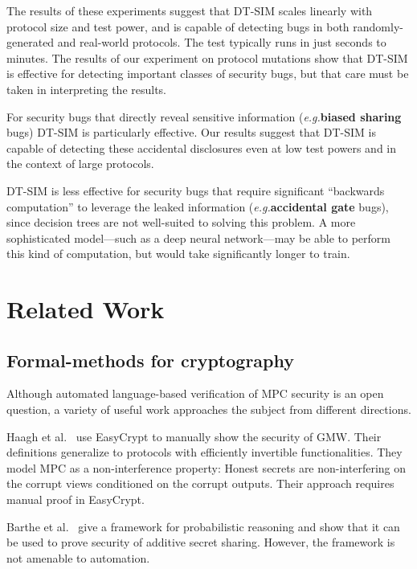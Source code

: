 \documentclass[acmlarge, manuscript, screen, review, anonymous, table]{acmart}
\newcommand{\eg}{\textit{e.g.}\xspace}
\newcommand{\toolname}{\textsc{DT-SIM}\xspace}
\begin{document}
The results of these experiments suggest that \toolname scales linearly with protocol size and test power, and is capable of detecting bugs in both randomly-generated and real-world protocols. The test typically runs in just seconds to minutes. The results of our experiment on protocol mutations show that \toolname is effective for detecting important classes of security bugs, but that care must be taken in interpreting the results.

For security bugs that directly reveal sensitive information (\eg \textbf{biased sharing} bugs) \toolname is particularly effective. Our results suggest that \toolname is capable of detecting these accidental disclosures even at low test powers and in the context of large protocols.
 
\toolname is less effective for security bugs that require significant ``backwards computation'' to leverage the leaked information (\eg \textbf{accidental gate} bugs), since decision trees are not well-suited to solving this problem. A more sophisticated model---such as a deep neural network---may be able to perform this kind of computation, but would take significantly longer to train.



\section{Related Work}

\subsection{Formal-methods for cryptography}
Although automated language-based verification of MPC security is an open question,
a variety of useful work approaches the subject from different directions.

Haagh et al.~\cite{haagh2018computer} %
use EasyCrypt to manually show the security of GMW.
Their definitions generalize to protocols with efficiently invertible functionalities.
They model MPC as a non-interference property: Honest secrets are non-interfering on the corrupt views conditioned on the corrupt outputs.
Their approach requires manual proof in EasyCrypt.

Barthe et al.~\cite{barthe2019probabilistic} %
give a framework for probabilistic reasoning and show that it can be used to prove security of additive secret sharing.
However, the framework is not amenable to automation.
\end{document}
